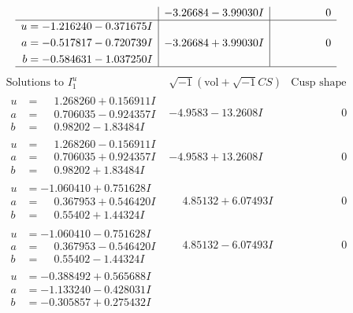 \documentclass[1p]{elsarticle_modified}
\theoremstyle{definition}
\newcommand{\I}{\sqrt{-1}}
\begin{document}
$$\begin{array}{c|c|c}
 & -3.26684 - 3.99030 I & \phantom{-0.000000 } 0 \\ \hline\begin{aligned}
u &= -1.216240 - 0.371675 I \\
a &= -0.517817 - 0.720739 I \\
b &= -0.584631 - 1.037250 I\end{aligned}
 & -3.26684 + 3.99030 I & \phantom{-0.000000 } 0\\
 \hline 
 \end{array}$$\newpage$$\begin{array}{c|c|c}  
\text{Solutions to }I^u_{1}& \I (\text{vol} + \sqrt{-1}CS) & \text{Cusp shape}\\
 \hline 
\begin{aligned}
u &= \phantom{-}1.268260 + 0.156911 I \\
a &= \phantom{-}0.706035 - 0.924357 I \\
b &= \phantom{-}0.98202 - 1.83484 I\end{aligned}
 & -4.9583 - 13.2608 I & \phantom{-0.000000 } 0 \\ \hline\begin{aligned}
u &= \phantom{-}1.268260 - 0.156911 I \\
a &= \phantom{-}0.706035 + 0.924357 I \\
b &= \phantom{-}0.98202 + 1.83484 I\end{aligned}
 & -4.9583 + 13.2608 I & \phantom{-0.000000 } 0 \\ \hline\begin{aligned}
u &= -1.060410 + 0.751628 I \\
a &= \phantom{-}0.367953 + 0.546420 I \\
b &= \phantom{-}0.55402 + 1.44324 I\end{aligned}
 & \phantom{-}4.85132 + 6.07493 I & \phantom{-0.000000 } 0 \\ \hline\begin{aligned}
u &= -1.060410 - 0.751628 I \\
a &= \phantom{-}0.367953 - 0.546420 I \\
b &= \phantom{-}0.55402 - 1.44324 I\end{aligned}
 & \phantom{-}4.85132 - 6.07493 I & \phantom{-0.000000 } 0 \\ \hline\begin{aligned}
u &= -0.388492 + 0.565688 I \\
a &= -1.133240 - 0.428031 I \\
b &= -0.305857 + 0.275432 I\end{aligned}

\end{array}$$
\end{document}
